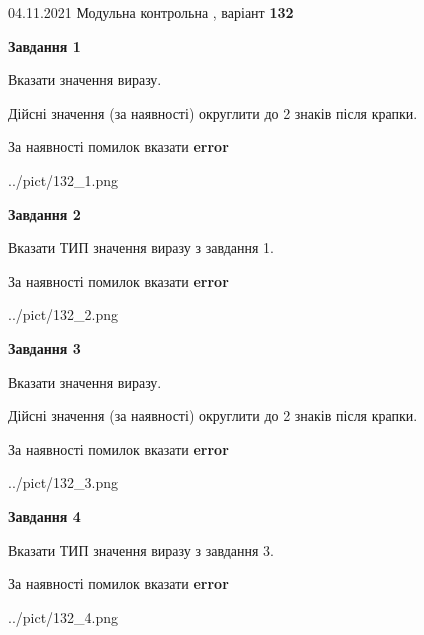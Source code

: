 \documentclass[11pt, ukrainian]{article}
\begin{document}
{04.11.2021 Модульна контрольна , варіант  \No \textbf { 132 }\par}
{
\begin {large}
{\begin {center}\textbf{Завдання 1}\end {center}}\par
Вказати значення виразу. \par
Дійсні значення (за наявності) округлити до 2 знаків після крапки. \par
За наявності помилок вказати \textbf{error}

\begin{center}
	{../pict/132_1.png}
\end{center}
\newpage

{\begin {center}\textbf{Завдання 2}\end {center}}\par
Вказати ТИП значення виразу з завдання 1. \par
За наявності помилок вказати \textbf{error}

\begin{center}
	{../pict/132_2.png}
\end{center}
\newpage

{\begin {center}\textbf{Завдання 3}\end {center}}\par
Вказати значення виразу. \par
Дійсні значення (за наявності) округлити до 2 знаків після крапки. \par
За наявності помилок вказати \textbf{error}

\begin{center}
	{../pict/132_3.png}
\end{center}
\newpage

{\begin {center}\textbf{Завдання 4}\end {center}}\par
Вказати ТИП значення виразу з завдання 3. \par
За наявності помилок вказати \textbf{error}

\begin{center}
	{../pict/132_4.png}
\end{center}
\newpage


\end{large}}
\end{document}
